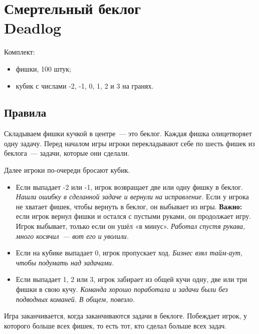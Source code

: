 



\thispagestyle{empty}

\section*{Смертельный беклог \\
{\smaller Deadlog}}

Комплект:

\begin{itemize}
    \item фишки, 100 штук;
    \item кубик с числами -2, -1, 0, 1, 2 и 3 на гранях.
\end{itemize}

\subsection*{Правила}

Складываем фишки кучкой в центре — это беклог.
Каждая фишка олицетворяет одну задачу.
Перед началом игры игроки перекладывают себе по шесть фишек из беклога — задачи, которые они сделали.

Далее игроки по-очереди бросают кубик.

\begin{itemize}
    \item Если выпадает -2 или -1, игрок возвращает две или одну фишку в беклог.
    \textit{Нашли ошибку в сделанной задаче и вернули на исправление.}
    Если у игрока не хватает фишек, чтобы вернуть в беклог, он выбывает из игры.
    \textbf{Важно:} если игрок вернул фишки и остался с пустыми руками, он продолжает игру.
    Игрок выбывает, только если он ушёл «в минус».
    \textit{Работал спустя рукава, много косячил — вот его и уволили.}

    \item Если на кубике выпадает 0, игрок пропускает ход.
    \textit{Бизнес взял тайм-аут, чтобы подумать над задачами.}

    \item Если выпадает 1, 2 или 3, игрок забирает из общей кучи одну, две или три фишки в свою кучу.
    \textit{Команда хорошо поработала и задачи были без подводных команей. В общем, повезло.}
\end{itemize}

Игра заканчивается, когда заканчиваются задачи в беклоге.
Побеждает игрок, у которого больше всех фишек, то есть тот, кто сделал больше всех задач.

